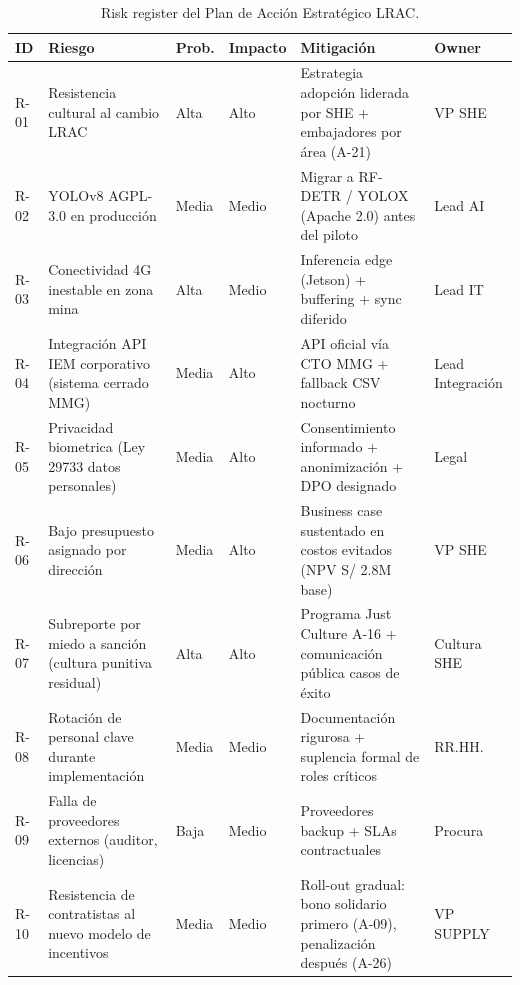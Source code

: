 \begin{table}[h]
\centering\footnotesize
\setlength{\tabcolsep}{4pt}
\begin{tabularx}{\linewidth}{@{}p{0.7cm} X p{1cm} p{1cm} X p{1.5cm}@{}}
\toprule
\textbf{ID} & \textbf{Riesgo} & \textbf{Prob.} & \textbf{Impacto} & \textbf{Mitigación} & \textbf{Owner} \\
\midrule
R-01 & Resistencia cultural al cambio LRAC & Alta & Alto & Estrategia adopción liderada por SHE + embajadores por área (A-21) & VP SHE \\
R-02 & YOLOv8 AGPL-3.0 en producción & Media & Medio & Migrar a RF-DETR / YOLOX (Apache 2.0) antes del piloto & Lead AI \\
R-03 & Conectividad 4G inestable en zona mina & Alta & Medio & Inferencia edge (Jetson) + buffering + sync diferido & Lead IT \\
R-04 & Integración API IEM corporativo (sistema cerrado MMG) & Media & Alto & API oficial vía CTO MMG + fallback CSV nocturno & Lead Integración \\
R-05 & Privacidad biometrica (Ley 29733 datos personales) & Media & Alto & Consentimiento informado + anonimización + DPO designado & Legal \\
R-06 & Bajo presupuesto asignado por dirección & Media & Alto & Business case sustentado en costos evitados (NPV S/ 2.8M base) & VP SHE \\
R-07 & Subreporte por miedo a sanción (cultura punitiva residual) & Alta & Alto & Programa Just Culture A-16 + comunicación pública casos de éxito & Cultura SHE \\
R-08 & Rotación de personal clave durante implementación & Media & Medio & Documentación rigurosa + suplencia formal de roles críticos & RR.HH. \\
R-09 & Falla de proveedores externos (auditor, licencias) & Baja & Medio & Proveedores backup + SLAs contractuales & Procura \\
R-10 & Resistencia de contratistas al nuevo modelo de incentivos & Media & Medio & Roll-out gradual: bono solidario primero (A-09), penalización después (A-26) & VP SUPPLY \\
\bottomrule
\end{tabularx}
\caption{Risk register del Plan de Acción Estratégico LRAC.}
\label{tab:riesgos}
\end{table}